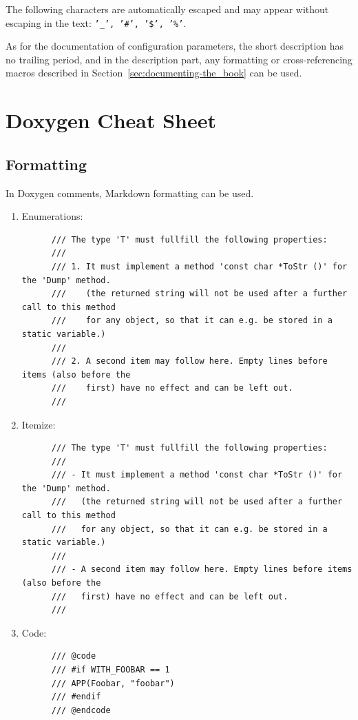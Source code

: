 \documentclass[12pt,english,parskip=half,headheight=19pt]{scrreprt}
\renewenvironment{description}[1][8ex]
  {\list{}{\labelwidth=5ex \leftmargin=#1 \let\makelabel\descriptionlabel}}
  {\endlist}
\begin{document}
\begin{description}
{The following characters are automatically escaped and may appear without escaping in the text:
\texttt{'\_', '\#', '\$', '\%'}.

As for the documentation of configuration parameters, the short description has no trailing period, and in the description part, any formatting or cross-referencing macros described in Section~\ref{sec:documenting-the_book} can be used.




\section{Doxygen Cheat Sheet}


\subsection{Formatting}

In Doxygen comments, Markdown formatting can be used.

\begin{enumerate}
  \item Enumerations:
    \begin{lstlisting}
      /// The type 'T' must fullfill the following properties:
      ///
      /// 1. It must implement a method 'const char *ToStr ()' for the 'Dump' method.
      ///    (the returned string will not be used after a further call to this method
      ///    for any object, so that it can e.g. be stored in a static variable.)
      ///
      /// 2. A second item may follow here. Empty lines before items (also before the
      ///    first) have no effect and can be left out.
      ///
    \end{lstlisting}
  \item Itemize:
    \begin{lstlisting}
      /// The type 'T' must fullfill the following properties:
      ///
      /// - It must implement a method 'const char *ToStr ()' for the 'Dump' method.
      ///   (the returned string will not be used after a further call to this method
      ///   for any object, so that it can e.g. be stored in a static variable.)
      ///
      /// - A second item may follow here. Empty lines before items (also before the
      ///   first) have no effect and can be left out.
      ///
    \end{lstlisting}
  \item Code:
    \begin{lstlisting}
      /// @code
      /// #if WITH_FOOBAR == 1
      /// APP(Foobar, "foobar")
      /// #endif
      /// @endcode
    \end{lstlisting}
\end{enumerate}



}
\end{description}
\end{document}
